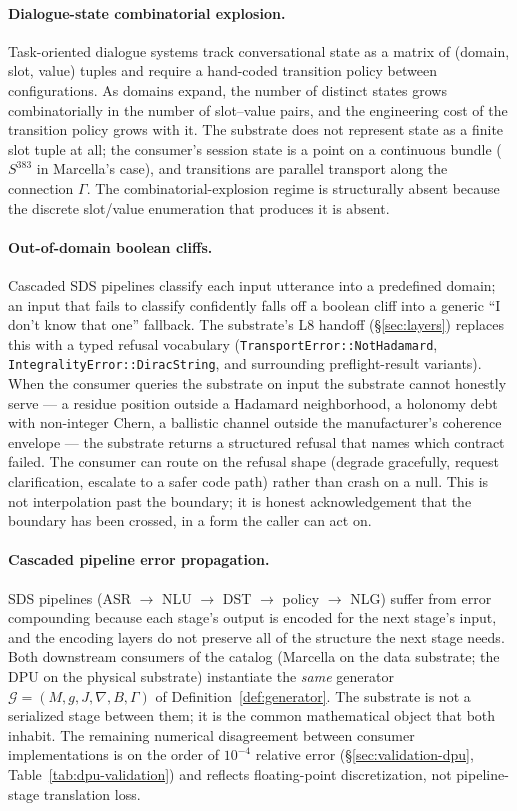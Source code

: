 \documentclass[11pt,letterpaper]{article}
\begin{document}
\paragraph{Dialogue-state combinatorial explosion.}
Task-oriented dialogue systems track conversational state as a
matrix of (domain, slot, value) tuples and require a hand-coded
transition policy between configurations. As domains expand, the
number of distinct states grows combinatorially in the number of
slot--value pairs, and the engineering cost of the transition
policy grows with it. The substrate does not represent state as a
finite slot tuple at all; the consumer's session state is a point
on a continuous bundle ($S^{383}$ in Marcella's case), and
transitions are parallel transport along the connection
$\Gamma$. The combinatorial-explosion regime is structurally absent
because the discrete slot/value enumeration that produces it is
absent.

\paragraph{Out-of-domain boolean cliffs.}
Cascaded SDS pipelines classify each input utterance into a
predefined domain; an input that fails to classify confidently
falls off a boolean cliff into a generic ``I don't know that one''
fallback. The substrate's L8 handoff (\S\ref{sec:layers}) replaces
this with a typed refusal vocabulary
(\texttt{TransportError::NotHadamard},
\texttt{IntegralityError::DiracString}, and surrounding
preflight-result variants). When the
consumer queries the substrate on input the substrate cannot
honestly serve --- a residue position outside a Hadamard
neighborhood, a holonomy debt with non-integer Chern, a ballistic
channel outside the manufacturer's coherence envelope --- the
substrate returns a structured refusal that names which contract
failed. The consumer can route on the refusal shape (degrade
gracefully, request clarification, escalate to a safer code path)
rather than crash on a null. This is not interpolation past the
boundary; it is honest acknowledgement that the boundary has been
crossed, in a form the caller can act on.

\paragraph{Cascaded pipeline error propagation.}
SDS pipelines (ASR $\to$ NLU $\to$ DST $\to$ policy $\to$ NLG)
suffer from error compounding because each stage's output is
encoded for the next stage's input, and the encoding layers do not
preserve all of the structure the next stage needs. Both
downstream consumers of the catalog (Marcella on the data
substrate; the DPU on the physical substrate) instantiate the
\emph{same} generator $\mathcal{G} = (M, g, J, \nabla, B, \Gamma)$
of Definition~\ref{def:generator}. The substrate is not a
serialized stage between them; it is the common mathematical
object that both inhabit. The remaining numerical disagreement
between consumer implementations is on the order of $10^{-4}$
relative error (\S\ref{sec:validation-dpu},
Table~\ref{tab:dpu-validation}) and reflects floating-point
discretization, not pipeline-stage translation loss.
\end{document}
